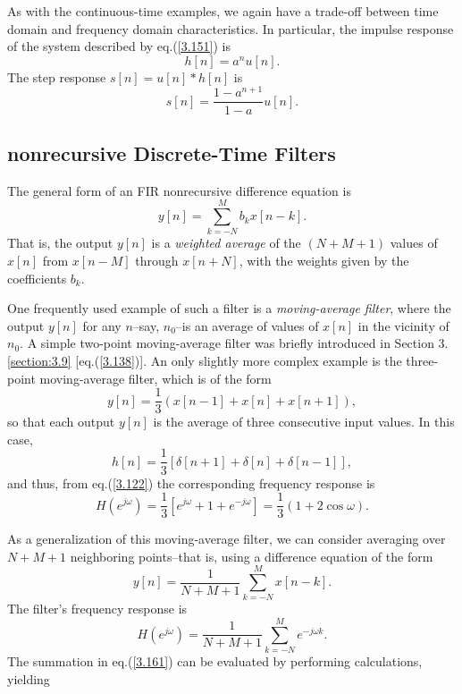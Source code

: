 \documentclass[a4paper,10pt,twoside]{book}
\begin{document}
As with the continuous-time examples, we again have a trade-off between time domain and frequency domain characteristics. In particular, the impulse response of the system described by eq.\;(\ref{3.151}) is
\begin{equation}
    h[n]=a^nu[n].
    \label{3.155}
\end{equation}
The step response $s[n]=u[n]*h[n]$ is
\begin{equation}
    s[n]=\frac{1-a^{n+1}}{1-a}u[n].
    \label{3.156}
\end{equation}

\subsection{nonrecursive Discrete-Time Filters}

The general form of an FIR nonrecursive difference equation is
\begin{equation}
    y[n]=\sum_{k=-N}^Mb_kx[n-k].
    \label{3.157}
\end{equation}
That is, the output $y[n]$ is a \textit{weighted average} of the $(N+M+1)$ values of $x[n]$ from $x[n-M]$ through $x[n+N]$, with the weights given by the coefficients $b_k$.

One frequently used example of such a filter is a \textit{moving-average filter}, where the output $y[n]$ for any $n$--say, $n_0$--is an average of values of $x[n]$ in the vicinity of $n_0$. A simple two-point moving-average filter was briefly introduced in Section 3.\ref{section:3.9} [eq.\;(\ref{3.138})]. An only slightly more complex example is the three-point moving-average filter, which is of the form
\begin{equation}
    y[n]=\frac13(x[n-1]+x[n]+x[n+1]),
    \label{3.158}
\end{equation}
so that each output $y[n]$ is the average of three consecutive input values. In this case, $$h[n]=\frac13[\delta[n+1]+\delta[n]+\delta[n-1]],$$ and thus, from eq.\;(\ref{3.122}) the corresponding frequency response is
\begin{equation}
    H(e^{j\omega})=\frac13[e^{j\omega}+1+e^{-j\omega}]=\frac13(1+2\cos\omega).
    \label{3.159}
\end{equation}

As a generalization of this moving-average filter, we can consider averaging over $N+M+1$ neighboring points--that is, using a difference equation of the form
\begin{equation}
    y[n]=\frac1{N+M+1}\sum_{k=-N}^Mx[n-k].
    \label{3.160}
\end{equation}
The filter's frequency response is
\begin{equation}
    H(e^{j\omega})=\frac1{N+M+1}\sum_{k=-N}^Me^{-j\omega k}.
    \label{3.161}
\end{equation}
The summation in eq.\;(\ref{3.161}) can be evaluated by performing calculations, yielding
\begin{equation}
    
\end{equation}
\end{document}
